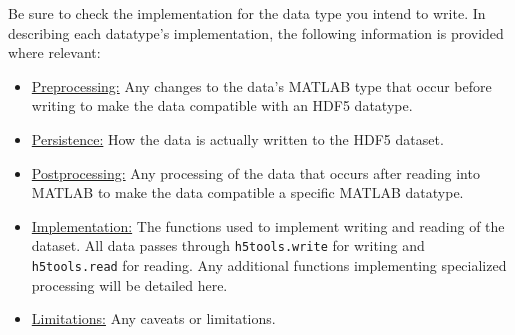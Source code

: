 \documentclass[11pt]{exam}
\newcommand\myfcn[1]{\colorbox{codegray}{\textcolor{codeblue}{\texttt{#1}}}}
\begin{document}
		$\quad$\\
        \noindent Be sure to check the implementation for the data type you intend to write. In describing each datatype's implementation, the following information is provided where relevant:
        \begin{itemize}
            \item \underline{Preprocessing:} Any changes to the data's MATLAB type that occur before writing to make the data compatible with an HDF5 datatype.
            \item \underline{Persistence:} How the data is actually written to the HDF5 dataset.
            \item \underline{Postprocessing:} Any processing of the data that occurs after reading into MATLAB to make the data compatible a specific MATLAB datatype.
            \item \underline{Implementation:} The functions used to implement writing and reading of the dataset. All data passes through \myfcn{h5tools.write} for writing and \myfcn{h5tools.read} for reading. Any additional functions implementing specialized processing will be detailed here. 
			\item \underline{Limitations:} Any caveats or limitations.
        \end{itemize}
\end{document}
